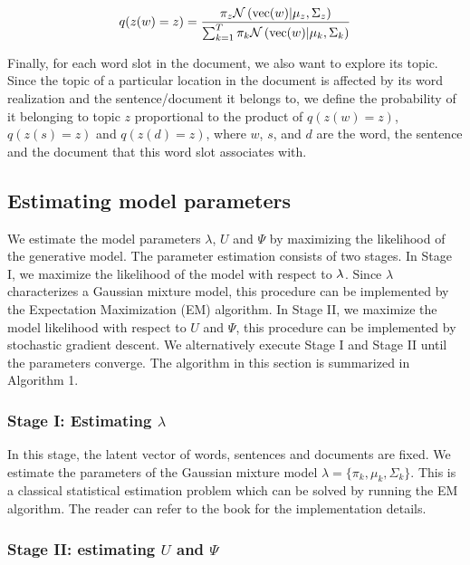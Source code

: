 \documentclass[english,letter]{article}
\renewcommand\[{\begin{equation}}
\renewcommand\]{\end{equation}}
\begin{document}
\[
q(z(w)=z)=\frac{\pi_{z}{\cal N}\left({\rm vec}(w)|\mu_{z},\Sigma_{z}\right)}{\sum_{k=1}^{T}\pi_{k}{\cal N}\left({\rm vec}(w)|\mu_{k},\Sigma_{k}\right)}
\]


Finally, for each word slot in the document, we also want to explore
its topic. Since the topic of a particular location in the document
is affected by its word realization and the sentence/document it belongs
to, we define the probability of it belonging to topic $z$ proportional
to the product of $q(z(w)=z)$, $q(z(s)=z)$ and $q(z(d)=z)$, where
$w$, $s$, and $d$ are the word, the sentence and the document that
this word slot associates with.


\subsection{Estimating model parameters}

We estimate the model parameters $\lambda$, $U$ and $\varPsi$ by
maximizing the likelihood of the generative model. The parameter estimation
consists of two stages. In Stage I, we maximize the likelihood of
the model with respect to $\text{\ensuremath{\lambda}}$. Since $\lambda$
characterizes a Gaussian mixture model, this procedure can be implemented
by the Expectation Maximization (EM) algorithm. In Stage II, we maximize
the model likelihood with respect to $U$ and $\varPsi$, this procedure
can be implemented by stochastic gradient descent. We alternatively
execute Stage I and Stage II until the parameters converge. The algorithm
in this section is summarized in Algorithm 1.


\subsubsection{Stage I: Estimating $\lambda$}

In this stage, the latent vector of words, sentences and documents
are fixed. We estimate the parameters of the Gaussian mixture model
$\lambda=\{\pi_{k},\mu_{k},\Sigma_{k}\}$. This is a classical statistical
estimation problem which can be solved by running the EM algorithm.
The reader can refer to the book \cite{bishop2006pattern} for the
implementation details.


\subsubsection{Stage II: estimating $U$ and $\varPsi$}
\end{document}
